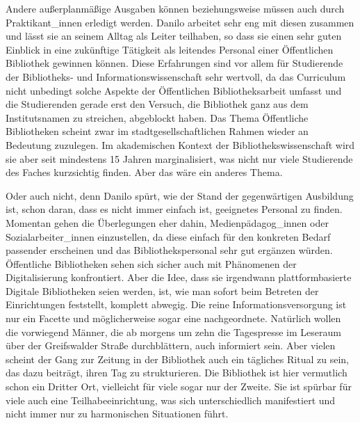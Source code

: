 \documentclass[a4paper,
fontsize=11pt,
oneside,
numbers=noperiodatend,
parskip=half-,
bibliography=totoc,
final
]{scrartcl}
\begin{document}
Andere außerplanmäßige Ausgaben können beziehungsweise müssen auch durch
Praktikant\_innen erledigt werden. Danilo arbeitet sehr eng mit diesen
zusammen und lässt sie an seinem Alltag als Leiter teilhaben, so dass
sie einen sehr guten Einblick in eine zukünftige Tätigkeit als leitendes
Personal einer Öffentlichen Bibliothek gewinnen können. Diese
Erfahrungen sind vor allem für Studierende der Bibliotheks- und
Informationswissenschaft sehr wertvoll, da das Curriculum nicht
unbedingt solche Aspekte der Öffentlichen Bibliotheksarbeit umfasst und
die Studierenden gerade erst den Versuch, die Bibliothek ganz aus dem
Institutsnamen zu streichen, abgeblockt haben. Das Thema Öffentliche
Bibliotheken scheint zwar im stadtgesellschaftlichen Rahmen wieder an
Bedeutung zuzulegen. Im akademischen Kontext der Bibliothekswissenschaft
wird sie aber seit mindestens 15 Jahren marginalisiert, was nicht nur
viele Studierende des Faches kurzsichtig finden. Aber das wäre ein
anderes Thema.

Oder auch nicht, denn Danilo spürt, wie der Stand der gegenwärtigen
Ausbildung ist, schon daran, dass es nicht immer einfach ist, geeignetes
Personal zu finden. Momentan gehen die Überlegungen eher dahin,
Medienpädagog\_innen oder Sozialarbeiter\_innen einzustellen, da diese
einfach für den konkreten Bedarf passender erscheinen und das
Bibliothekspersonal sehr gut ergänzen würden. Öffentliche Bibliotheken
sehen sich sicher auch mit Phänomenen der Digitalisierung konfrontiert.
Aber die Idee, dass sie irgendwann plattformbasierte Digitale
Bibliotheken seien werden, ist, wie man sofort beim Betreten der
Einrichtungen feststellt, komplett abwegig. Die reine
Informationsversorgung ist nur ein Facette und möglicherweise sogar eine
nachgeordnete. Natürlich wollen die vorwiegend Männer, die ab morgens um
zehn die Tagespresse im Leseraum über der Greifswalder Straße
durchblättern, auch informiert sein. Aber vielen scheint der Gang zur
Zeitung in der Bibliothek auch ein tägliches Ritual zu sein, das dazu
beiträgt, ihren Tag zu strukturieren. Die Bibliothek ist hier vermutlich
schon ein Dritter Ort, vielleicht für viele sogar nur der Zweite. Sie
ist spürbar für viele auch eine Teilhabeeinrichtung, was sich
unterschiedlich manifestiert und nicht immer nur zu harmonischen
Situationen führt.

\href{img/pankow-volksbuecherei.jpg}{}
\end{document}
